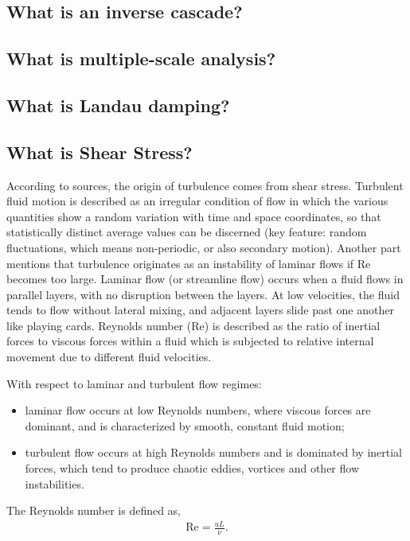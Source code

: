 \subsection{What is an inverse cascade?}

\subsection{What is multiple-scale analysis?}

\subsection{What is Landau damping?}

\subsection{What is Shear Stress?}
According to sources, the origin of turbulence comes from shear stress. Turbulent fluid motion is described as an irregular condition of flow in which the various quantities show a random variation with time and space coordinates, so that statistically distinct average values can be discerned (key feature: random fluctuations, which means non-periodic, or also secondary motion). Another part mentions that turbulence originates as an instability of laminar flows if Re becomes too large. Laminar flow (or streamline flow) occurs when a fluid flows in parallel layers, with no disruption between the layers. At low velocities, the fluid tends to flow without lateral mixing, and adjacent layers slide past one another like playing cards. Reynolds number (Re) is described as the ratio of inertial forces to viscous forces within a fluid which is subjected to relative internal movement due to different fluid velocities. 

\shear

With respect to laminar and turbulent flow regimes:
\begin{itemize}
	\item laminar flow occurs at low Reynolds numbers, where viscous forces are dominant, and is characterized by smooth, constant fluid motion;
	\item turbulent flow occurs at high Reynolds numbers and is dominated by inertial forces, which tend to produce chaotic eddies, vortices and other flow instabilities.
\end{itemize} 

The Reynolds number is defined as, 
\begin{align}
	\text{Re} = \frac{u L}{\nu}.
\end{align}

